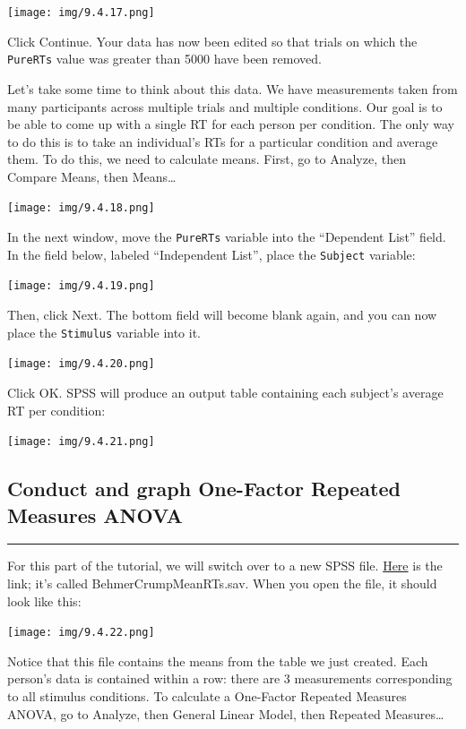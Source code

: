 \documentclass[]{book}
\begin{document}
\texttt{[image: img/9.4.17.png]}

Click {Continue}. Your data has now been edited so that trials on which
the \texttt{PureRTs} value was greater than 5000 have been removed.

Let's take some time to think about this data. We have measurements
taken from many participants across multiple trials and multiple
conditions. Our goal is to be able to come up with a single RT for each
person per condition. The only way to do this is to take an individual's
RTs for a particular condition and average them. To do this, we need to
calculate means. First, go to {Analyze}, then {Compare Means}, then {
Means\ldots{}}

\texttt{[image: img/9.4.18.png]}

In the next window, move the \texttt{PureRTs} variable into the
``Dependent List'' field. In the field below, labeled ``Independent
List'', place the \texttt{Subject} variable:

\texttt{[image: img/9.4.19.png]}

Then, click {Next}. The bottom field will become blank again, and you
can now place the \texttt{Stimulus} variable into it.

\texttt{[image: img/9.4.20.png]}

Click {OK}. SPSS will produce an output table containing each subject's
average RT per condition:

\texttt{[image: img/9.4.21.png]}

\subsection{Conduct and graph One-Factor Repeated Measures
ANOVA}\label{conduct-and-graph-one-factor-repeated-measures-anova}

\begin{center}\rule{0.5\linewidth}{0.5pt}\end{center}

For this part of the tutorial, we will switch over to a new SPSS file.
\href{https://github.com/CrumpLab/statisticsLab/blob/master/data/spssdata/BehmerCrumpMeanRTs.sav}{Here}
is the link; it's called BehmerCrumpMeanRTs.sav. When you open the file,
it should look like this:

\texttt{[image: img/9.4.22.png]}

Notice that this file contains the means from the table we just created.
Each person's data is contained within a row: there are 3 measurements
corresponding to all stimulus conditions. To calculate a One-Factor
Repeated Measures ANOVA, go to {Analyze}, then {General Linear Model},
then {Repeated Measures\ldots{}}
\end{document}
